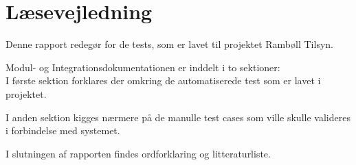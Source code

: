 \chapter*{Læsevejledning}
Denne rapport redegør for de tests, som er lavet til projektet Rambøll Tilsyn. 

Modul- og Integrationsdokumentationen er inddelt i to sektioner:\\
I første sektion forklares der omkring de automatiserede test som er lavet i projektet.

I anden sektion kigges nærmere på de manulle test cases som ville skulle valideres i forbindelse med systemet.

I slutningen af rapporten  findes ordforklaring og litteraturliste.